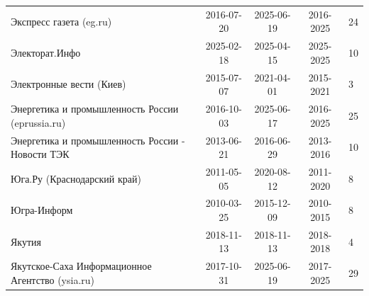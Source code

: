 \begin{longtable}{p{6cm}cccp{2cm}}
Экспресс газета (eg.ru) & 2016-07-20 & 2025-06-19 & 2016-2025 & 24\\
Электорат.Инфо & 2025-02-18 & 2025-04-15 & 2025-2025 & 10\\
Электронные вести (Киев) & 2015-07-07 & 2021-04-01 & 2015-2021 & 3\\
Энергетика и промышленность России (eprussia.ru) & 2016-10-03 & 2025-06-17 & 2016-2025 & 25\\
Энергетика и промышленность России - Новости ТЭК & 2013-06-21 & 2016-06-29 & 2013-2016 & 10\\
Юга.Ру (Краснодарский край) & 2011-05-05 & 2020-08-12 & 2011-2020 & 8\\
Югра-Информ & 2010-03-25 & 2015-12-09 & 2010-2015 & 8\\
Якутия & 2018-11-13 & 2018-11-13 & 2018-2018 & 4\\
Якутское-Саха Информационное Агентство (ysia.ru) & 2017-10-31 & 2025-06-19 & 2017-2025 & 29\\
\end{longtable}
